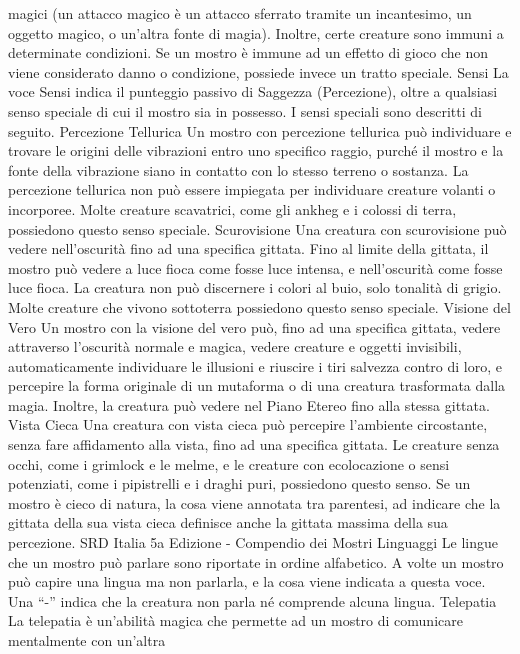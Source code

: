 \begin{multicols}{2}
magici (un attacco magico è un attacco sferrato tramite
un incantesimo, un oggetto magico, o un’altra fonte di
magia). Inoltre, certe creature sono immuni a
determinate condizioni. Se un mostro è immune ad un
effetto di gioco che non viene considerato danno o
condizione, possiede invece un tratto speciale.
Sensi
La voce Sensi indica il punteggio passivo di Saggezza
(Percezione), oltre a qualsiasi senso speciale di cui il
mostro sia in possesso. I sensi speciali sono descritti di
seguito.
Percezione Tellurica
Un mostro con percezione tellurica può individuare e
trovare le origini delle vibrazioni entro uno specifico
raggio, purché il mostro e la fonte della vibrazione siano
in contatto con lo stesso terreno o sostanza. La
percezione tellurica non può essere impiegata per
individuare creature volanti o incorporee. Molte creature
scavatrici, come gli ankheg e i colossi di terra,
possiedono questo senso speciale.
Scurovisione
Una creatura con scurovisione può vedere nell’oscurità
fino ad una specifica gittata. Fino al limite della gittata, il
mostro può vedere a luce fioca come fosse luce
intensa, e nell’oscurità come fosse luce fioca. La
creatura non può discernere i colori al buio, solo
tonalità di grigio. Molte creature che vivono sottoterra
possiedono questo senso speciale.
Visione del Vero
Un mostro con la visione del vero può, fino ad una
specifica gittata, vedere attraverso l’oscurità normale e
magica, vedere creature e oggetti invisibili,
automaticamente individuare le illusioni e riuscire i tiri
salvezza contro di loro, e percepire la forma originale di
un mutaforma o di una creatura trasformata dalla
magia. Inoltre, la creatura può vedere nel Piano Etereo
fino alla stessa gittata.
Vista Cieca
Una creatura con vista cieca può percepire l’ambiente
circostante, senza fare affidamento alla vista, fino ad
una specifica gittata.
Le creature senza occhi, come i grimlock e le melme, e
le creature con ecolocazione o sensi potenziati, come i
pipistrelli e i draghi puri, possiedono questo senso.
Se un mostro è cieco di natura, la cosa viene annotata
tra parentesi, ad indicare che la gittata della sua vista
cieca definisce anche la gittata massima della sua
percezione.
SRD Italia 5a Edizione - Compendio dei Mostri
Linguaggi
Le lingue che un mostro può parlare sono riportate in
ordine alfabetico. A volte un mostro può capire una
lingua ma non parlarla, e la cosa viene indicata a
questa voce. Una “-” indica che la creatura non parla né
comprende alcuna lingua.
Telepatia
La telepatia è un’abilità magica che permette ad un
mostro di comunicare mentalmente con un’altra

\end{multicols}
